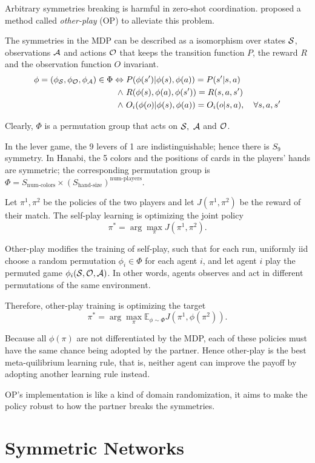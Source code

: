 \documentclass[12pt]{article}
\begin{document}
\begin{spacing}{1.15}
Arbitrary symmetries breaking is harmful in zero-shot coordination. \cite{hu2020other} proposed a method called \textsl{other-play} (OP) to alleviate this problem.

The symmetries in the MDP can be described as a isomorphism over states $\S$, observations $\A$ and actions $\O$ that keeps the transition function $P$, the reward $R$ and the observation function $O$ invariant.
\begin{align*}
  \phi=(\phi_\S,\phi_\O,\phi_\A)\in\Phi
  \Leftrightarrow{}& P(\phi(s')|\phi(s),\phi(a))=P(s'|s,a) \\
  \wedge~{}& R(\phi(s),\phi(a),\phi(s'))=R(s,a,s') \\
  \wedge~{}& O_i(\phi(o)|\phi(s),\phi(a))=O_i(o|s,a),\quad\forall s,a,s'
\end{align*}

Clearly, $\Phi$ is a permutation group that acts on $\S,~\A$ and $\O$.

In the lever game, the 9 levers of 1 are indistinguishable; hence there is $S_9$ symmetry. In Hanabi, the 5 colors and the positions of cards in the players' hands are symmetric; the corresponding permutation group is $\Phi=S_{\text{num-colors}}\times (S_{\text{hand-size}})^{\text{num-players}}$.

Let $\pi^1, \pi^2$ be the policies of the two players and let $J(\pi^1, \pi^2)$ be the reward of their match. The self-play learning is optimizing the joint policy \[\pi^* = \arg\max_{\pi} J(\pi^1, \pi^2).\]

Other-play modifies the training of self-play, such that for each run, uniformly iid choose a random permutation $\phi_i\in\Phi$ for each agent $i$, and let agent $i$ play the permuted game $\phi_i(\S,\O,\A)$. In other words, agents observes and act in different permutations of the same environment.

Therefore, other-play training is optimizing the target \[\pi^* = \arg\max_{\pi} \mathbb{E}_{\phi\sim \Phi} J(\pi^1, \phi(\pi^2)).\]

Because all $\phi(\pi)$ are not differentiated by the MDP, each of these policies must have the same chance being adopted by the partner. Hence other-play is the best meta-quilibrium learning rule, that is, neither agent can improve the payoff by adopting another learning rule instead.

OP's implementation is like a kind of domain randomization, it aims to make the policy robust to how the partner breaks the symmetries.

\section{Symmetric Networks}

\end{spacing}
\end{document}
